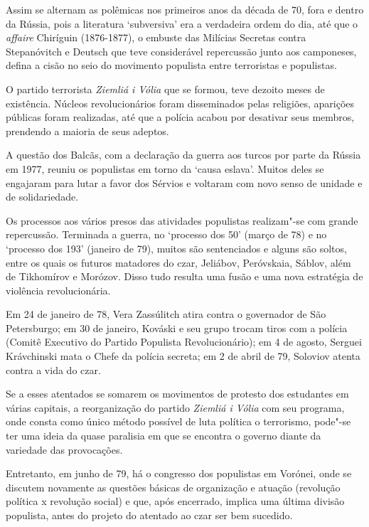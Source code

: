 Assim se alternam as polêmicas nos primeiros anos da década de 70, fora
e dentro da Rússia, pois a literatura `subversiva' era a verdadeira
ordem do dia, até que o \emph{affaire} Chiríguin (1876-1877), o embuste
das Milícias Secretas contra Stepanóvitch e Deutsch que teve
considerável repercussão junto aos camponeses, defina a cisão no seio do
movimento populista entre terroristas e populistas.

O partido terrorista \emph{Ziemliá i Vólia} que se formou, teve dezoito
meses de existência. Núcleos revolucionários foram disseminados pelas
religiões, aparições públicas foram realizadas, até que a polícia acabou
por desativar seus membros, prendendo a maioria de seus adeptos.

A questão dos Balcãs, com a declaração da guerra aos turcos por parte da
Rússia em 1977, reuniu os populistas em torno da `causa eslava'. Muitos
deles se engajaram para lutar a favor dos Sérvios e voltaram com novo
senso de unidade e de solidariedade.

Os processos aos vários presos das atividades populistas realizam"-se com
grande repercussão. Terminada a guerra, no `processo dos 50' (março de
78) e no `processo dos 193' (janeiro de 79), muitos são sentenciados e
alguns são soltos, entre os quais os futuros matadores do czar,
Jeliábov, Peróvskaia, Sáblov, além de Tikhomírov e Morózov. Disso tudo
resulta uma fusão e uma nova estratégia de violência revolucionária.

Em 24 de janeiro de 78, Vera Zassúlitch atira contra o governador de São
Petersburgo; em 30 de janeiro, Kováski e seu grupo trocam tiros com a
polícia (Comitê Executivo do Partido Populista Revolucionário); em 4 de
agosto, Serguei Krávchinski mata o Chefe da polícia secreta; em 2 de
abril de 79, Soloviov atenta contra a vida do czar.

Se a esses atentados se somarem os movimentos de protesto dos estudantes
em várias capitais, a reorganização do partido \emph{Ziemliá i Vólia}
com seu programa, onde consta como único método possível de luta
política o terrorismo, pode"-se ter uma ideia da quase paralisia em que
se encontra o governo diante da variedade das provocações.

Entretanto, em junho de 79, há o congresso dos populistas em Vorónei,
onde se discutem novamente as questões básicas de organização e atuação
(revolução política x revolução social) e que, após encerrado, implica
uma última divisão populista, antes do projeto do atentado ao czar ser
bem sucedido.

